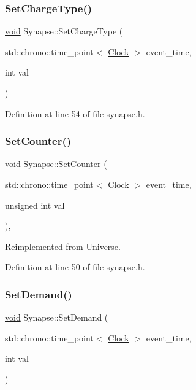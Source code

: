 \subsubsection{\texorpdfstring{Set\+Charge\+Type()}{SetChargeType()}}
{\footnotesize\ttfamily \mbox{\hyperlink{glad_8h_a950fc91edb4504f62f1c577bf4727c29}{void}} Synapse\+::\+Set\+Charge\+Type (\begin{DoxyParamCaption}\item[{std\+::chrono\+::time\+\_\+point$<$ \mbox{\hyperlink{universe_8h_a0ef8d951d1ca5ab3cfaf7ab4c7a6fd80}{Clock}} $>$}]{event\+\_\+time,  }\item[{int}]{val }\end{DoxyParamCaption})\hspace{0.3cm}{\ttfamily [inline]}}



Definition at line 54 of file synapse.\+h.

\mbox{\label{class_synapse_aa1a990a7b89fbeaf1109a8b70d86111b}} 
\subsubsection{\texorpdfstring{Set\+Counter()}{SetCounter()}}
{\footnotesize\ttfamily \mbox{\hyperlink{glad_8h_a950fc91edb4504f62f1c577bf4727c29}{void}} Synapse\+::\+Set\+Counter (\begin{DoxyParamCaption}\item[{std\+::chrono\+::time\+\_\+point$<$ \mbox{\hyperlink{universe_8h_a0ef8d951d1ca5ab3cfaf7ab4c7a6fd80}{Clock}} $>$}]{event\+\_\+time,  }\item[{unsigned int}]{val }\end{DoxyParamCaption})\hspace{0.3cm}{\ttfamily [inline]}, {\ttfamily [virtual]}}



Reimplemented from \mbox{\hyperlink{class_universe_aa22202ae740eb1355529afcb13285e91}{Universe}}.



Definition at line 50 of file synapse.\+h.

\mbox{\label{class_synapse_a1a6e54f679223615065572502df5e257}} 
\subsubsection{\texorpdfstring{Set\+Demand()}{SetDemand()}}
{\footnotesize\ttfamily \mbox{\hyperlink{glad_8h_a950fc91edb4504f62f1c577bf4727c29}{void}} Synapse\+::\+Set\+Demand (\begin{DoxyParamCaption}\item[{std\+::chrono\+::time\+\_\+point$<$ \mbox{\hyperlink{universe_8h_a0ef8d951d1ca5ab3cfaf7ab4c7a6fd80}{Clock}} $>$}]{event\+\_\+time,  }\item[{int}]{val }\end{DoxyParamCaption})}



